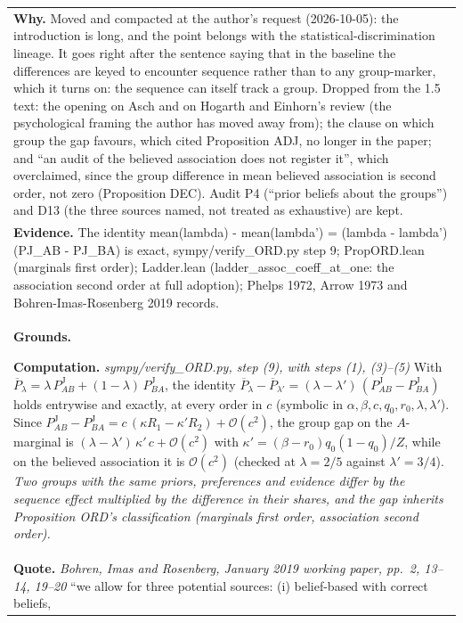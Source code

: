 \documentclass[10pt]{article}
\theoremstyle{definition}
\newcommand{\PJ}{P^{\mathrm{J}}}
\newcommand{\Pbar}{\overline{P}}
\newcommand{\bigO}{\mathcal{O}}
\newlength{\fullw}\setlength{\fullw}{25.9cm}
\begin{document}
{\begin{longtable}{|p{0.9cm}|p{12.2cm}|p{12.2cm}|}
\multicolumn{3}{|p{\fullw}|}{\textbf{Why.} Moved and compacted at the author's request (2026-10-05): the introduction is long, and the point belongs with the statistical-discrimination lineage. It goes right after the sentence saying that in the baseline the differences are keyed to encounter sequence rather than to any group-marker, which it turns on: the sequence can itself track a group. Dropped from the 1.5 text: the opening on Asch and on Hogarth and Einhorn's review (the psychological framing the author has moved away from); the clause on which group the gap favours, which cited Proposition ADJ, no longer in the paper; and ``an audit of the believed association does not register it'', which overclaimed, since the group difference in mean believed association is second order, not zero (Proposition DEC). Audit P4 (``prior beliefs about the groups'') and D13 (the three sources named, not treated as exhaustive) are kept.} \\
\multicolumn{3}{|p{\fullw}|}{\textbf{Evidence.} The identity mean(lambda) - mean(lambda') = (lambda - lambda')(PJ\_AB - PJ\_BA) is exact, sympy/verify\_ORD.py step 9; PropORD.lean (marginals first order); Ladder.lean (ladder\_assoc\_coeff\_at\_one: the association second order at full adoption); Phelps 1972, Arrow 1973 and Bohren-Imas-Rosenberg 2019 records.} \\ \hline
\multicolumn{3}{|p{\fullw}|}{\textbf{Grounds.}\par \textbf{Computation.} \textit{sympy/verify\_ORD.py, step (9), with steps (1), (3)--(5)} \newline With $\Pbar_\lambda=\lambda\,\PJ_{AB}+(1-\lambda)\,\PJ_{BA}$, the identity
$\Pbar_{\lambda}-\Pbar_{\lambda'}=(\lambda-\lambda')\,(\PJ_{AB}-\PJ_{BA})$ holds entrywise
and exactly, at every order in $c$ (symbolic in $\alpha,\beta,c,q_0,r_0,\lambda,\lambda'$).
Since $\PJ_{AB}-\PJ_{BA}=c\,(\kappa R_1-\kappa' R_2)+\bigO(c^2)$, the group gap on the
$A$-marginal is $(\lambda-\lambda')\,\kappa'\,c+\bigO(c^2)$ with
$\kappa'=(\beta-r_0)q_0(1-q_0)/Z$, while on the believed association it is $\bigO(c^2)$
(checked at $\lambda=2/5$ against $\lambda'=3/4$). \newline \textit{Two groups with the same priors, preferences and evidence differ by the
sequence effect multiplied by the difference in their shares, and the gap inherits
Proposition ORD's classification (marginals first order, association second order).}} \\
\multicolumn{3}{|p{\fullw}|}{\textbf{Quote.} \textit{Bohren, Imas and Rosenberg, January 2019 working paper, pp.~2, 13--14, 19--20} \newline ``we allow for three potential sources: (i) belief-based with correct beliefs,
}
\end{longtable}}
\end{document}
